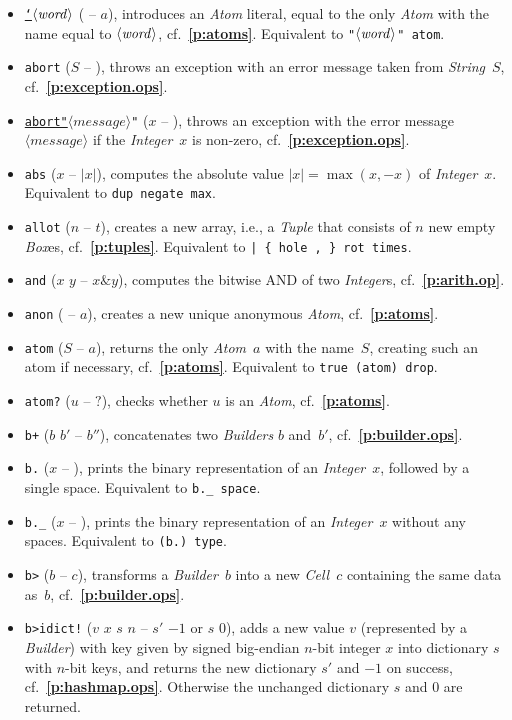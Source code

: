 \documentclass[12pt,oneside]{article}
\def\refpoint#1{{\rm\textbf{\ref{#1}}}}
\let\ptref=\refpoint
\begin{document}
\begin{itemize}
\item {\tt \underline{`}$\langle\textit{word\/}\rangle$} ( -- $a$), introduces an {\em Atom\/} literal, equal to the only {\em Atom\/} with the name equal to $\langle\textit{word\/}\rangle$, cf.~\ptref{p:atoms}. Equivalent to {\tt "$\langle\textit{word\/}\rangle$" atom}. 
\item {\tt abort} ($S$ -- ), throws an exception with an error message taken from {\em String\/}~$S$, cf.~\ptref{p:exception.ops}.
\item {\tt \underline{abort"}$\langle\textit{message}\rangle$"} ($x$ -- ), throws an exception with the error message $\langle\textit{message}\rangle$ if the {\em Integer\/}~$x$ is non-zero, cf.~\ptref{p:exception.ops}.
\item {\tt abs} ($x$ -- $|x|$), computes the absolute value $|x|=\max(x,-x)$ of {\em Integer\/}~$x$. Equivalent to {\tt dup negate max}.
\item {\tt allot} ($n$ -- $t$), creates a new array, i.e., a {\em Tuple\/} that consists of $n$ new empty {\em Box\/}es, cf.~\ptref{p:tuples}. Equivalent to {\tt | \{ hole , \} rot times}.
\item {\tt and} ($x$ $y$ -- $x\& y$), computes the bitwise AND of two {\em Integer\/}s, cf.~\ptref{p:arith.op}.
\item {\tt anon} ( -- $a$), creates a new unique anonymous {\em Atom}, cf.~\ptref{p:atoms}.
\item {\tt atom} ($S$ -- $a$), returns the only {\em Atom\/}~$a$ with the name~$S$, creating such an atom if necessary, cf.~\ptref{p:atoms}. Equivalent to {\tt true (atom) drop}.
\item {\tt atom?} ($u$ -- $?$), checks whether $u$ is an {\em Atom}, cf.~\ptref{p:atoms}.
\item {\tt b+} ($b$ $b'$ -- $b''$), concatenates two {\em Builders\/} $b$ and~$b'$, cf.~\ptref{p:builder.ops}.
\item {\tt b.} ($x$ -- ), prints the binary representation of an {\em Integer\/}~$x$, followed by a single space. Equivalent to {\tt b.\_ space}.
\item {\tt b.\_} ($x$ -- ), prints the binary representation of an {\em Integer\/}~$x$ without any spaces. Equivalent to {\tt (b.)~type}.
\item {\tt b>} ($b$ -- $c$), transforms a {\em Builder\/}~$b$ into a new {\em Cell\/}~$c$ containing the same data as~$b$, cf.~\ptref{p:builder.ops}.
\item {\tt b>idict!} ($v$ $x$ $s$ $n$ -- $s'$ $-1$ or $s$ $0$), adds a new value $v$ (represented by a {\em Builder}) with key given by signed big-endian $n$-bit integer $x$ into dictionary $s$ with $n$-bit keys, and returns the new dictionary $s'$ and $-1$ on success, cf.~\ptref{p:hashmap.ops}. Otherwise the unchanged dictionary $s$ and $0$ are returned.

\end{itemize}
\end{document}

